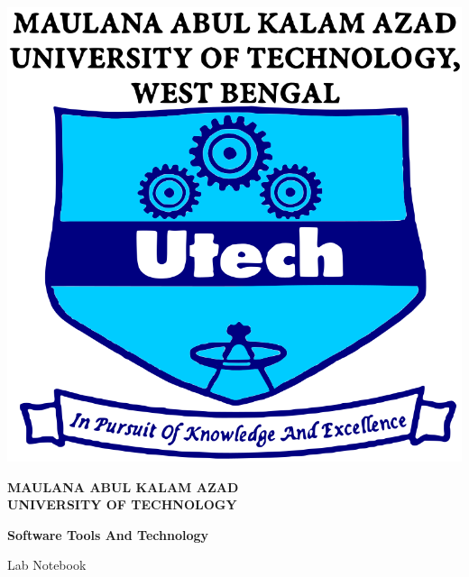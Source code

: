 \begin{titlepage}

    \begin{center}
        \begin{minipage}{0.1\textwidth}
            \includegraphics[width=\linewidth]{Images/makaut_logo.png}
        \end{minipage}
        \hspace{1em}
        \begin{minipage}{0.8\textwidth}
            \fontsize{14}{20}\selectfont
            \Large{\textbf{MAULANA ABUL KALAM AZAD\\
            UNIVERSITY OF TECHNOLOGY}}
        \end{minipage}
    \end{center}
    
    \vspace{4em}
    
    \begin{center}
        \Large
        \textbf{Software Tools And Technology}
        
        \vspace{1em}
        
        \Large
        Lab Notebook
    \end{center}
    

\end{titlepage}
